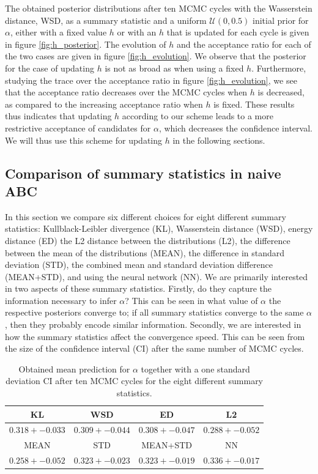 \documentclass[11pt,a4paper]{article}
\begin{document}
The obtained posterior distributions after ten MCMC cycles with the Wasserstein distance, WSD, as a summary statistic and a uniform $\mathcal{U}(0, 0.5)$ initial prior for $\alpha$, either with a fixed value $h$ or with an $h$ that is updated for each cycle is given in figure \ref{fig:h_posterior}. The evolution of $h$ and the acceptance ratio for each of the two cases are given in figure \ref{fig:h_evolution}. We observe that the posterior for the case of updating $h$ is not as broad as when using a fixed $h$. Furthermore, studying the trace over the acceptance ratio in figure \ref{fig:h_evolution}, we see that the acceptance ratio decreases over the MCMC cycles when $h$ is decreased, as compared to the increasing acceptance ratio when $h$ is fixed. These results thus indicates that updating $h$ according to our scheme leads to a more restrictive acceptance of candidates for $\alpha$, which decreases the confidence interval. We will thus use this scheme for updating $h$ in the following sections.


\subsection[Task 1]{Comparison of summary statistics in naive ABC}
\label{sec:result_comp_sum_stat}

In this section we compare six different choices for eight different summary statistics: Kullblack-Leibler divergence (KL), Wasserstein distance (WSD), energy distance (ED) the L2 distance between the distributions (L2), the difference between the mean of the distributions (MEAN), the difference in standard deviation (STD), the combined mean and standard deviation difference (MEAN+STD), and using the neural network (NN). We are primarily interested in two aspects of these summary statistics. Firstly, do they capture the information necessary to infer $\alpha$? This can be seen in what value of $\alpha$ the respective posteriors converge to; if all summary statistics converge to the same $\alpha$, then they probably encode similar information. Secondly, we are interested in how the summary statistics affect the convergence speed. This can be seen from the size of the confidence interval (CI) after the same number of MCMC cycles. 

\begin{table}[h]
    \centering
    \caption{Obtained mean prediction for $\alpha$ together with a one standard deviation CI after ten MCMC cycles for the eight different summary statistics.}
    \begin{tabular}{||c c c c ||} 
         \hline
         KL & WSD & ED & L2   \\ [0.5ex] 
         \hline
         $0.318 +- 0.033$ & $0.309 +- 0.044$ & $0.308 +- 0.047$ & $0.288 +- 0.052$  \\ [0.5ex]
         \hline
         MEAN & STD & MEAN+STD & NN   \\
         \hline
         $0.258 +- 0.052$ & $0.323 +- 0.023$ & $0.323 +- 0.019$ & $0.336 +- 0.017$  \\ [0.5ex]
         \hline
    \end{tabular}
    \label{tab:sum_stat}
\end{table}
\end{document}
